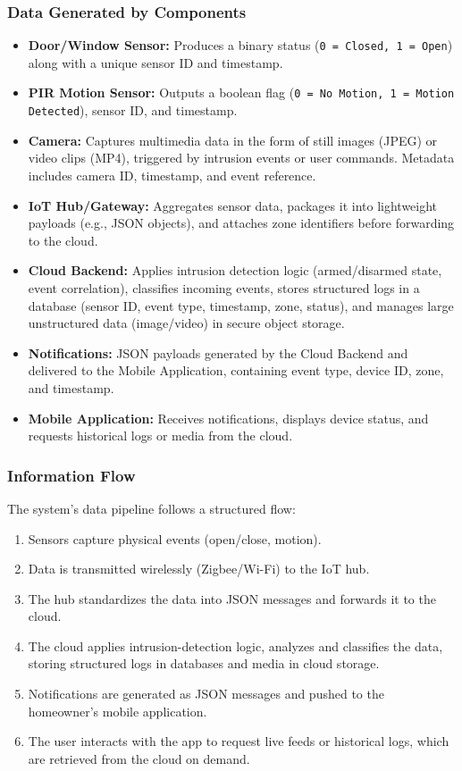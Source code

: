 \documentclass[conference]{IEEEtran}
\begin{document}
\subsubsection{Data Generated by Components}
\begin{itemize}
    \item \textbf{Door/Window Sensor:} Produces a binary status (\texttt{0 = Closed, 1 = Open}) along with a unique sensor ID and timestamp.
    \item \textbf{PIR Motion Sensor:} Outputs a boolean flag (\texttt{0 = No Motion, 1 = Motion Detected}), sensor ID, and timestamp.
    \item \textbf{Camera:} Captures multimedia data in the form of still images (JPEG) or video clips (MP4), triggered by intrusion events or user commands. Metadata includes camera ID, timestamp, and event reference.
    \item \textbf{IoT Hub/Gateway:} Aggregates sensor data, packages it into lightweight payloads (e.g., JSON objects), and attaches zone identifiers before forwarding to the cloud.
    \item \textbf{Cloud Backend:} Applies intrusion detection logic (armed/disarmed state, event correlation), classifies incoming events, stores structured logs in a database (sensor ID, event type, timestamp, zone, status), and manages large unstructured data (image/video) in secure object storage.
    \item \textbf{Notifications:} JSON payloads generated by the Cloud Backend and delivered to the Mobile Application, containing event type, device ID, zone, and timestamp.
    \item \textbf{Mobile Application:} Receives notifications, displays device status, and requests historical logs or media from the cloud.
\end{itemize}

\subsubsection{Information Flow}
The system’s data pipeline follows a structured flow:
\begin{enumerate}
    \item Sensors capture physical events (open/close, motion).
    \item Data is transmitted wirelessly (Zigbee/Wi-Fi) to the IoT hub.
    \item The hub standardizes the data into JSON messages and forwards it to the cloud.
    \item The cloud applies intrusion-detection logic, analyzes and classifies the data, storing structured logs in databases and media in cloud storage.
    \item Notifications are generated as JSON messages and pushed to the homeowner’s mobile application.
    \item The user interacts with the app to request live feeds or historical logs, which are retrieved from the cloud on demand.
\end{enumerate}
\end{document}
